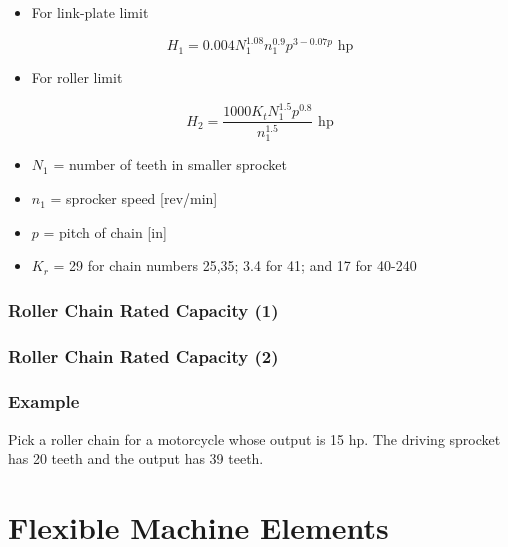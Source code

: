\documentclass[
10pt,
a4paper,
openany,
svgnames,
]{book}
\begin{document}
\begin{itemize}
\item For link-plate limit
\end{itemize}

$$ H_1 = 0.004 N_1^{1.08} n_1^{0.9} p^{3-0.07p} \text{ hp} $$

\begin{itemize}
\item For roller limit
\end{itemize}

$$ H_2 = \frac{1000 K_t N_1^{1.5} p^{0.8}}{n_1^{1.5}} \text{ hp}$$

\begin{itemize}
\item \(N_1\) = number of teeth in smaller sprocket
\item \(n_1\) = sprocker speed [rev/min]
\item \(p\) = pitch of chain [in]
\item \(K_r\) = 29 for chain numbers 25,35; 3.4 for 41; and 17 for 40-240
\end{itemize}

\subsection*{Roller Chain Rated Capacity (1)}
\label{sec:org0628cf3}

\begin{center}
\end{center}

\subsection*{Roller Chain Rated Capacity (2)}
\label{sec:org657786e}

\begin{center}
\end{center}

\subsection*{Example}
\label{sec:orgda325e7}

Pick a roller chain for a motorcycle whose output is 15 hp. The driving sprocket has 20 teeth and the output has 39 teeth.

\chapter{Flexible Machine Elements}
\end{document}

